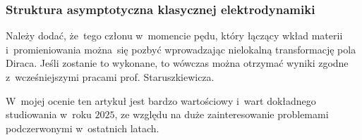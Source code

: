 \documentclass[10pt,t]{beamer}
\begin{document}
\begin{frame}
  \frametitle{Struktura asymptotyczna klasycznej elektrodynamiki}


  Należy dodać, że~tego członu w~momencie pędu, który łączący wkład materii
  i~promieniowania można~się pozbyć wprowadzając nielokalną transformację
  pola Diraca. Jeśli zostanie to wykonane, to wówczas można otrzymać wyniki
  zgodne z~wcześniejszymi pracami prof. Staruszkiewicza.




  W~mojej ocenie ten artykuł jest bardzo wartościowy i~wart dokładnego
  studiowania w~roku $2025$, ze względu na duże zainteresowanie problemami
  podczerwonymi w~ostatnich latach.

\end{frame}
\end{document}
